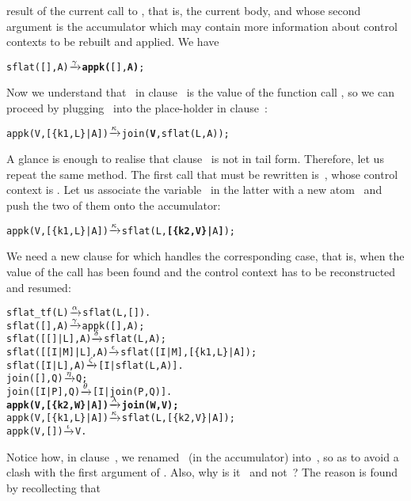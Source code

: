 result of the current call to , that is, the current
body, and whose second argument is the accumulator which may contain
more information about control contexts to be rebuilt and applied. We
have
\begin{alltt}
sflat(       [],A) \(\smashedrightarrow{\gamma}\) \textbf{appk(}[],\textbf{A)};
\end{alltt}
Now we understand that~ in clause~\clause{\kappa} is the
value of the function call , so we
can proceed by plugging~ into the place\hyp{}holder in
clause~\clause{\kappa}:
\begin{alltt}
appk(V,[\{k1,L\}|A]) \(\smashedrightarrow{\kappa}\) join(\textbf{V},sflat(L,A));
\end{alltt}
A glance is enough to realise that clause~\clause{\kappa} is not in
tail form. Therefore, let us repeat the same method. The first call
that must be rewritten is~, whose control context
is . Let us associate the
variable~ in the latter with a new atom~ and
push the two of them onto the accumulator:
\begin{alltt}
appk(V,[\{k1,L\}|A]) \(\smashedrightarrow{\kappa}\) sflat(L,\textbf{[\{k2,V\}|}A\textbf{]});
\end{alltt}
We need a new clause for  which handles the
corresponding case, that is, when the value of the call has been found
and the control context has to be reconstructed and resumed:
\begin{alltt}
sflat_tf(L)        \(\smashedrightarrow{\alpha}\) sflat(L,[]).
sflat(       [],A) \(\smashedrightarrow{\gamma}\) appk([],A);
sflat(   [[]|L],A) \(\smashedrightarrow{\delta}\) sflat(L,A);
sflat([[I|M]|L],A) \(\smashedrightarrow{\epsilon}\) sflat([I|M],[\{k1,L\}|A]);
sflat(    [I|L],A) \(\smashedrightarrow{\zeta}\) [I|sflat(L,A)].
join(   [],Q)      \(\smashedrightarrow{\eta}\) Q;
join([I|P],Q)      \(\smashedrightarrow{\theta}\) [I|join(P,Q)].
\textbf{appk(V,[\{k2,W\}|A]) \(\smashedrightarrow{\lambda}\) join(W,V);}\hfill% A \emph{unused yet}
appk(V,[\{k1,L\}|A]) \(\smashedrightarrow{\kappa}\) sflat(L,[\{k2,V\}|A]);
appk(V,        []) \(\smashedrightarrow{\iota}\) V.
\end{alltt}
Notice how, in clause~\clause{\lambda}, we renamed~ (in the
accumulator) into~, so as to avoid a clash with the first
argument of . Also, why is it~ and
not~? The reason is found by recollecting that

